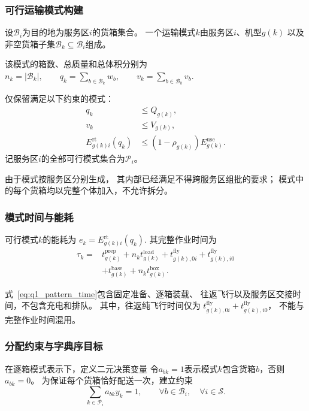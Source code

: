 \documentclass[bwprint]{gmcmthesis}
\begin{document}
\subsubsection{可行运输模式构建}

设$\mathcal{B}_i$为目的地为服务区$i$的货箱集合。
一个运输模式$k$由服务区$i$、机型$g(k)$
以及非空货箱子集$\mathcal{B}_k\subseteq\mathcal{B}_i$组成。

该模式的箱数、总质量和总体积分别为
\(n_k=|\mathcal{B}_k|, \qquad q_k=\sum_{b\in\mathcal{B}_k}w_b, \qquad v_k=\sum_{b\in\mathcal{B}_k}v_b\).

仅保留满足以下约束的模式：
\begin{align}
    q_k &\leq Q_{g(k)},\\
    v_k &\leq V_{g(k)},\\
    E_{g(k)i}^{\mathrm{rt}}(q_k)
    &\leq
    (1-\rho_{g(k)})E_{g(k)}^{\mathrm{use}}.
\end{align}
记服务区$i$的全部可行模式集合为$\mathcal{P}_i$。

由于模式按服务区分别生成，
其内部已经满足不得跨服务区组批的要求；
模式中的每个货箱均以完整个体加入，不允许拆分。

\subsubsection{模式时间与能耗}

可行模式$k$的能耗为
\(e_k=E_{g(k)i}^{\mathrm{rt}}(q_k)\).
其完整作业时间为
\begin{equation}
\begin{aligned}
    \tau_k={}&
    t_{g(k)}^{\mathrm{prep}}
    +n_k t_{g(k)}^{\mathrm{load}}
    +t_{g(k),0i}^{\mathrm{fly}}
    +t_{g(k),i0}^{\mathrm{fly}}\\
    &+
    t_{g(k)}^{\mathrm{base}}
    +n_k t_{g(k)}^{\mathrm{box}}.
\end{aligned}
\label{eq:q1_pattern_time}
\end{equation}

式~\eqref{eq:q1_pattern_time}包含固定准备、逐箱装载、
往返飞行以及服务区交接时间，不包含充电和排队。
其中，往返纯飞行时间仅为
$t_{g(k),0i}^{\mathrm{fly}}+t_{g(k),i0}^{\mathrm{fly}}$，
不能与完整作业时间混用。

\subsubsection{分配约束与字典序目标}

在逐箱模式表示下，定义二元决策变量
令$a_{bk}=1$表示模式$k$包含货箱$b$，否则$a_{bk}=0$。
为保证每个货箱恰好配送一次，建立约束
\begin{equation}
    \sum_{k\in\mathcal{P}_i}a_{bk}y_k=1,
    \qquad
    \forall b\in\mathcal{B}_i,\quad
    \forall i\in\mathcal{S}.
\label{eq:q1_exact_assignment}
\end{equation}
\end{document}
